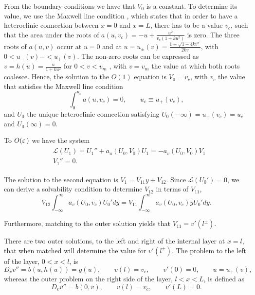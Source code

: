 From the boundary conditions we have that $V_0$ is a constant. To determine its value, we use the Maxwell line condition \cite{maxwell1994}, which states that in order to have a heteroclinic connection between $x=0$ and $x=L$, there has to be a value $v_c$, such that the area under the roots of $a(u,v_c) = -u +  \frac{u^2}{v_c(1+ku^2)}$ is zero. The three roots of $a(u,v)$ occur at $u=0$ and at $u=u_{\pm}(v) = \frac{1\pm\sqrt{1-4kv^2}}{2kv}$, with $0<u_-(v)-<u_+(v)$. The non-zero roots can be expressed as $v=h(u)=\frac{u}{1+ku^2}$ for $0<v<v_m$ , with $v=v_m$ the value at which both roots coalesce. Hence, the solution to the $O(1)$ equation is $V_0=v_c$, with $v_c$ the value that satisfies the Maxwell line condition
% 
\begin{equation*}
\label{eqn:maxwell}
\int_0^{u_c}a(u,v_c)=0,\qquad u_c\equiv u_+(v_c),
\end{equation*}
% 
and $U_0$ the unique heteroclinic connection satisfying $U_0(-\infty)=u_+(v_c)=u_c$ and $U_0(\infty)=0$.

To $O(\varepsilon\,)$ we have the system
% 
\begin{equation*}
\label{eqn:order_eps}
\begin{split}
\begin{aligned}
	&\mathcal{L}(U_1) = U_1'' + a_u(U_0,V_0)U_1 = -a_v(U_0,V_0)V_1\\
	&V_1'' = 0.
\end{aligned}
\end{split}
\end{equation*}

The solution to the second equation is $V_1 = V_{11}y + V_{12}$. Since $\mathcal{L}(U_0')=0$, we can derive a solvability condition to determine $V_{12}$ in terms of $V_{11}$,
% 
\begin{equation*}
  \label{eqn:solvability}
  V_{12}\int_{-\infty}^{\infty}a_v(U_0,v_c)U_0'dy = V_{11}\int_{-\infty}^{\infty}a_v(U_0,v_c)yU_0'dy.
\end{equation*}

Furthermore, matching to the outer solution yields that $V_{11} = v'(l^{\pm})$.

There are two outer solutions, to the left and right of the internal layer at $x=l$, that when matched will determine the value for $v'(l^{\pm})$. The problem to the left of the layer, $0<x<l$, is
% 
\begin{equation}
  \label{eqn:left}
  D_v v'' = b(u,h(u)) = g(u),\qquad v(l)=v_c,\qquad v'(0)=0,\qquad u = u_+(v),
\end{equation}
% 
whereas the outer problem on the right side of the layer, $l<x<L$, is defined as
% 
\begin{equation}
  \label{eqn:right}
  D_v v'' = b(0,v),\qquad v(l)=v_c,\qquad v'(L)=0.
\end{equation}

